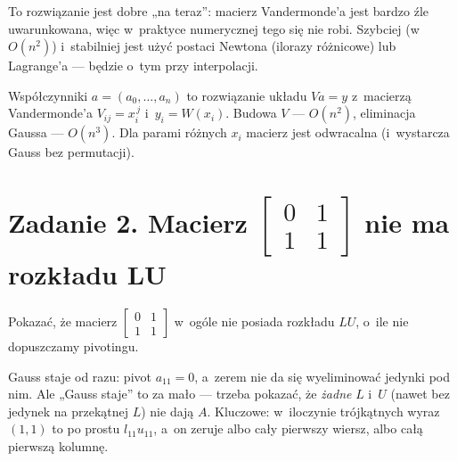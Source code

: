 \documentclass[11pt]{article}
\begin{document}
\begin{uwaga}
To rozwiązanie jest dobre „na teraz”: macierz Vandermonde'a jest bardzo
źle uwarunkowana, więc w~praktyce numerycznej tego się nie robi.
Szybciej (w~$O(n^2)$) i~stabilniej jest użyć postaci Newtona
(ilorazy różnicowe) lub Lagrange'a --- będzie o~tym przy interpolacji.
\end{uwaga}

\begin{odpowiedz}
Współczynniki $a=(a_0,\ldots,a_n)$ to rozwiązanie układu $Va=y$ z~macierzą
Vandermonde'a $V_{ij}=x_i^{\,j}$ i~$y_i=W(x_i)$. Budowa $V$ --- $O(n^2)$,
eliminacja Gaussa --- $O(n^3)$. Dla parami różnych $x_i$ macierz jest
odwracalna (i~wystarcza Gauss bez permutacji).
\end{odpowiedz}

\section{Zadanie 2. Macierz \texorpdfstring{$\left[\begin{smallmatrix}0&1\\1&1\end{smallmatrix}\right]$}{[[0,1],[1,1]]} nie ma rozkładu LU}
\begin{tresc}
Pokazać, że macierz
$\begin{bmatrix}0&1\\1&1\end{bmatrix}$
w~ogóle nie posiada rozkładu $LU$, o~ile nie dopuszczamy pivotingu.
\end{tresc}

\begin{intuicja}
Gauss staje od razu: pivot $a_{11}=0$, a~zerem nie da się wyeliminować
jedynki pod nim. Ale „Gauss staje” to za mało --- trzeba pokazać, że
\emph{żadne} $L$ i~$U$ (nawet bez jedynek na przekątnej $L$) nie dają $A$.
Kluczowe: w~iloczynie trójkątnych wyraz $(1,1)$ to po prostu $l_{11}u_{11}$,
a~on zeruje albo cały pierwszy wiersz, albo całą pierwszą kolumnę.
\end{intuicja}
\end{document}
